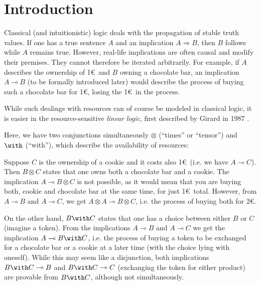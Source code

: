 \documentclass[DIN, pagenumber=false, fontsize=11pt, parskip=half, colorinlistoftodos, svgnames]{scrartcl}
\begin{document}
	\section{Introduction}
	
	
	
	Classical (and intuitionistic) logic deals with the propagation of stable truth values. 
	If one has a true sentence $A$ and an implication $A \Rightarrow B$, then $B$ follows while $A$ remains true. 
	However, real-life implications are often causal and modify their premises. 
	They cannot therefore be iterated arbitrarily. 
	For example, if $A$ describes the ownership of 1\euro\ and $B$ owning a chocolate bar, an implication $A \multimap B$ (to be formally introduced later) would describe the process of buying such a chocolate bar for 1\euro, losing the 1\euro\ in the process.
	
	While such dealings with resources can of course be modeled in classical logic, it is easier in the resource-sensitive \emph{linear logic}, first described by Girard in 1987 \cite{girard87}. 
	
	Here, we have two conjunctions simultaneously $\otimes$ (“times” or “tensor”) and $\with$ (“with”), which describe the availability of resources:
	
	Suppose $C$ is the ownership of a cookie and it costs also 1\euro\ (i.e. we have $A\multimap C$).
	Then $B \otimes C$ states that one owns both a chocolate bar and a cookie. 
	The implication $A \multimap B \otimes C$ is not possible, as it would mean that you are buying both, cookie and chocolate bar at the same time, for just 1\euro\ total. 
	However, from $A \multimap B$ and $A\multimap C$, we get $A \otimes A \multimap B \otimes C$, i.e. the process of buying both for 2\euro.
	
	On the other hand, $B \with C$ states that one has a choice between either $B$ or $C$ (imagine a token). 
	From the implications $A\multimap B$ and $A\multimap C$ we get the implication $A \multimap B \with C$, i.e. the process of buying a token to be exchanged for a chocolate bar or a cookie at a later time (with the choice lying with oneself). 
	While this may  seem like a disjunction, both implications $B\with C \multimap B$ and $B \with C \multimap C$ (exchanging the token for either product) are provable from $B \with C$, although not simultaneously. 
	
\end{document}
